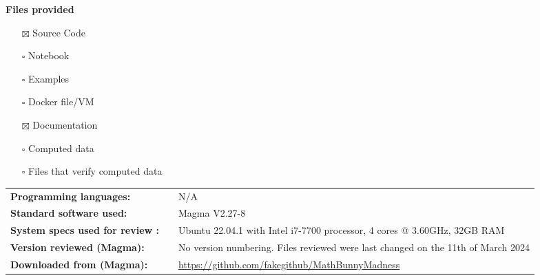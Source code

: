 \begin{minipage}{0.30\textwidth}
\noindent\parbox[t]{1.2in}{\raggedright%
\vspace{0.5em}
\textbf{Files provided}

\begin{itemize}[topsep=0pt,itemsep=-2pt,leftmargin=13pt]
\item[$\boxtimes$] Source Code
\item[$\square$] Notebook
\item[$\square$]  Examples
\item[$\square$] Docker file/VM
\end{itemize}

\vspace{0.5em}
}%
\parbox[t]{1.2in}{\raggedright%
\vspace{1em}
\begin{itemize}[topsep=6pt,itemsep=-2pt,leftmargin=13pt]
\item[$\boxtimes$]  Documentation
\item[$\square$]  Computed data
\item[$\square$] Files that verify computed data
\end{itemize}
\vspace{0.5em}
}
\end{minipage}%
\hfill
%
%
\begin{minipage}{0.6\textwidth}
\begin{tabular}[t]{p{13em} p{1em} p{17em}}
\textbf{Programming languages:} & &  N/A \\
\textbf{Standard software used: }& &  Magma V2.27-8   \\
\textbf{System specs used for review :}& &  Ubuntu 22.04.1 with Intel i7-7700 processor, 4 cores @ 3.60GHz, 32GB RAM \\
\textbf{Version reviewed (Magma):}& &  No version numbering. Files reviewed were last changed on the 11th of March 2024\\
\textbf{Downloaded from (Magma): }& &   \url{https://github.com/fakegithub/MathBunnyMadness} \\

\end{tabular}
\end{minipage}%